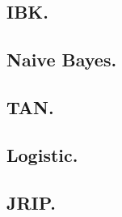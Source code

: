 \subsection{IBK.}

\subsection{Naive Bayes.}

\subsection{TAN.}

\subsection{Logistic.}

\subsection{JRIP.}